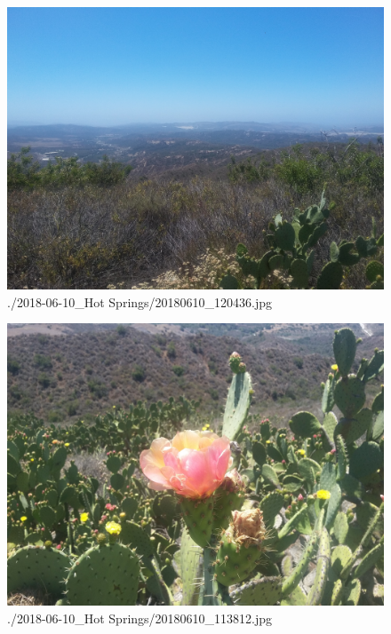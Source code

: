 \begin{minipage}{\textwidth}
\end{minipage}\newline{}\begin{figure}\centering\includegraphics[angle=0,origin=c,height=0.25\textheight]{./Bilder/2018-06-10_Hot Springs/20180610_120436.jpg}\caption*{./2018-06-10\_Hot Springs/20180610\_120436.jpg}\end{figure}\begin{figure}\centering\includegraphics[angle=0,origin=c,height=0.25\textheight]{./Bilder/2018-06-10_Hot Springs/20180610_113812.jpg}\caption*{./2018-06-10\_Hot Springs/20180610\_113812.jpg}\end{figure}\vspace{2em} ~\newline 
